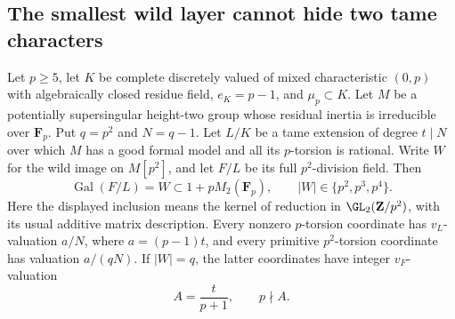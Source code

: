 \subsection{The smallest wild layer cannot hide two tame characters}

\begin{lemma}
\label{lem:B-RD55-valuations}
Let $p\ge5$, let $K$ be complete discretely valued of mixed
characteristic $(0,p)$ with algebraically closed residue field,
$e_K=p-1$, and $\mu_p\subset K$. Let $M$ be a potentially
supersingular height-two group whose residual inertia is
irreducible over $\mathbf F_p$. Put $q=p^2$ and $N=q-1$.
Let $L/K$ be a tame extension of degree $t\mid N$ over which
$M$ has a good formal model and all its $p$-torsion is rational.
Write $W$ for the wild image on $M[p^2]$, and let $F/L$ be
its full $p^2$-division field. Then
\[
       \operatorname{Gal}(F/L)=W\subset1+pM_2(\mathbf F_p),
       \qquad |W|\in\{p^2,p^3,p^4\}.                 \tag{B-RD55.1}
\]
Here the displayed inclusion means the kernel of reduction in
$\GL_2(\mathbf Z/p^2)$, with its usual additive matrix description.
Every nonzero $p$-torsion coordinate has $v_L$-valuation
$a/N$, where $a=(p-1)t$, and every primitive $p^2$-torsion
coordinate has valuation $a/(qN)$.
If $|W|=q$, the latter coordinates have integer $v_F$-valuation
\[
                         A=\frac{t}{p+1},\qquad p\nmid A.
                                                        \tag{B-RD55.2}
\]
\end{lemma}
